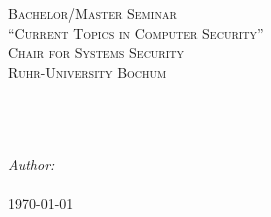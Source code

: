 
\begin{titlepage}

\centering

\vspace{2cm}

\textsc{\LARGE Bachelor/Master Seminar}\\[0.2cm]
\textsc{\LARGE ``Current Topics in Computer Security''}\\[0.9cm]
\textsc{\Large Chair for Systems Security}\\[0.5cm]
\textsc{\Large Ruhr-University Bochum}\\[1.5cm]

\HRule \\[0.4cm]
{ \huge \bfseries \@title}\\[0.4cm]

\HRule \\[1.5cm]

\begin{minipage}{0.4\textwidth}
\begin{flushleft} \large
\emph{Author:}\\{\@author}\\[1cm]
{\large \today}
\end{flushleft}
\end{minipage}

\end{titlepage}